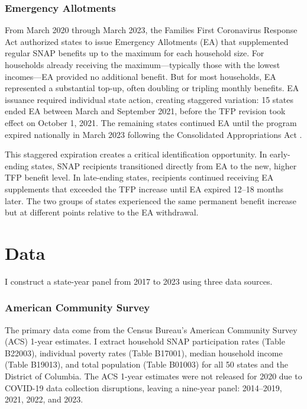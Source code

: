 \documentclass[12pt]{article}
\begin{document}
\subsubsection*{Emergency Allotments} From March 2020 through March 2023, the Families First Coronavirus Response Act authorized states to issue Emergency Allotments (EA) that supplemented regular SNAP benefits up to the maximum for each household size. For households already receiving the maximum---typically those with the lowest incomes---EA provided no additional benefit. But for most households, EA represented a substantial top-up, often doubling or tripling monthly benefits. EA issuance required individual state action, creating staggered variation: 15 states ended EA between March and September 2021, before the TFP revision took effect on October 1, 2021. The remaining states continued EA until the program expired nationally in March 2023 following the Consolidated Appropriations Act \citep{cbpp_ea_tracker, rosenbaum2023end}.

This staggered expiration creates a critical identification opportunity. In early-ending states, SNAP recipients transitioned directly from EA to the new, higher TFP benefit level. In late-ending states, recipients continued receiving EA supplements that exceeded the TFP increase until EA expired 12--18 months later. The two groups of states experienced the same permanent benefit increase but at different points relative to the EA withdrawal.

\section{Data}
\label{sec:data}

I construct a state-year panel from 2017 to 2023 using three data sources.

\subsubsection*{American Community Survey} The primary data come from the Census Bureau's American Community Survey (ACS) 1-year estimates. I extract household SNAP participation rates (Table B22003), individual poverty rates (Table B17001), median household income (Table B19013), and total population (Table B01003) for all 50 states and the District of Columbia. The ACS 1-year estimates were not released for 2020 due to COVID-19 data collection disruptions, leaving a nine-year panel: 2014--2019, 2021, 2022, and 2023.
\end{document}
